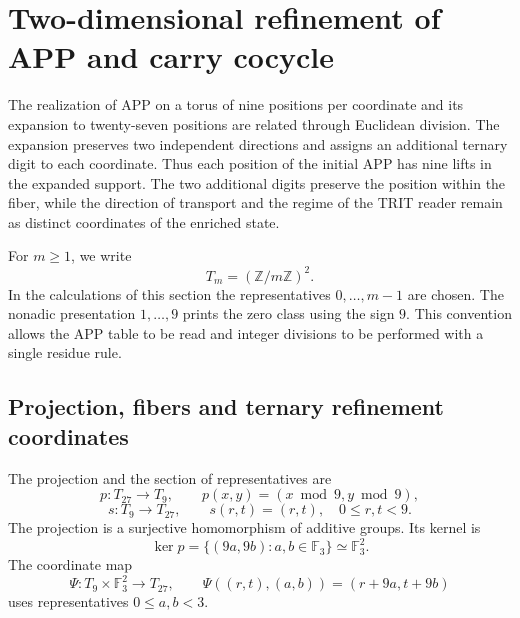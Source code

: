 \section{Two-dimensional refinement of APP and carry cocycle}
\label{sec:refinamiento-app-27-9}

The realization of APP on a torus of nine positions per coordinate
and its expansion to twenty-seven positions are related through Euclidean
division. The expansion preserves two independent directions and assigns
an additional ternary digit to each coordinate. Thus each position
of the initial APP has nine lifts in the expanded support.
The two additional digits preserve the position within the fiber,
while the direction of transport and the regime of the TRIT reader
remain as distinct coordinates of the enriched state.

For $m\geq1$, we write
\[
 T_m=(\mathbb Z/m\mathbb Z)^2.
\]
In the calculations of this section the representatives
$0,\ldots,m-1$ are chosen. The nonadic presentation $1,\ldots,9$ prints the
zero class using the sign $9$. This convention allows the APP table
to be read and integer divisions to be performed with a single residue rule.

\subsection{Projection, fibers and ternary refinement coordinates}

The projection and the section of representatives are
\[
 p:T_{27}\longrightarrow T_9,\qquad
 p(x,y)=(x\bmod9,y\bmod9),
\]
\[
 s:T_9\longrightarrow T_{27},\qquad s(r,t)=(r,t),
 \quad 0\leq r,t<9.
\]
The projection is a surjective homomorphism of additive groups. Its
kernel is
\[
 \ker p=\{(9a,9b):a,b\in\mathbb F_3\}
        \simeq\mathbb F_3^2.
\]
The coordinate map
\begin{equation}
 \Psi:T_9\times\mathbb F_3^2\longrightarrow T_{27},\qquad
 \Psi((r,t),(a,b))=(r+9a,t+9b)
 \label{eq:app-refinamiento-coordenadas}
\end{equation}
uses representatives $0\leq a,b<3$.

